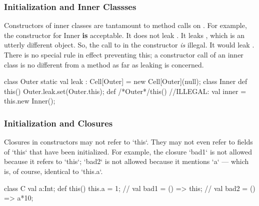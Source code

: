 \subsubsection{Initialization and Inner Classses}

Constructors of inner classes are tantamount to method calls on .
For example, the constructor for Inner {\bf is} acceptable.  It does not leak
.  It leaks , which is an utterly different object.
So, the call to  in the  constructor {\em
is} illegal.  It would leak .  There is no special rule in effect
preventing this; a constructor call of an inner class is no
different from a method as far as leaking is concerned.
\begin{xten}
class Outer {
  static val leak : Cell[Outer] = new Cell[Outer](null);
  class Inner {
     def this() {Outer.leak.set(Outer.this);}
  }
  def /*Outer*/this() {
     //ILLEGAL: val inner = this.new Inner();
  }
}
\end{xten}
%



\subsubsection{Initialization and Closures}

Closures in constructors may not refer to \xcd`this`.  They may not even refer
to fields of \xcd`this` that have been initialized.   For example, the
closure \xcd`bad1` is not allowed because it refers to \xcd`this`; \xcd`bad2`
is not allowed because it mentions \xcd`a` --- which is, of course, identical
to \xcd`this.a`. 

\begin{xten}
class C {
  val a:Int;
  def this() {
    this.a = 1;
    // val bad1 = () => this; 
    // val bad2 = () => a*10;
  }
}
\end{xten}
%


